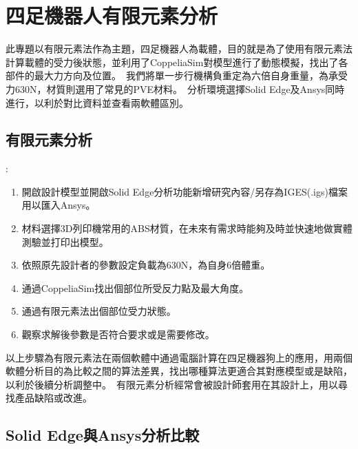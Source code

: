 \chapter{四足機器人有限元素分析}

此專題以有限元素法作為主題，四足機器人為載體，目的就是為了使用有限元素法計算載體的受力後狀態，並利用了CoppeliaSim對模型進行了動態模擬，找出了各部件的最大力方向及位置。\
我們將單一步行機構負重定為六倍自身重量，為承受力630N，材質則選用了常見的PVE材料。\
分析環境選擇Solid Edge及Ansys同時進行，以利於對比資料並查看兩軟體區別。\\

\section{有限元素分析}
\begin{itemize}
:\
  \begin{enumerate}
  \item 開啟設計模型並開啟Solid Edge分析功能新增研究內容/另存為IGES(.igs)檔案用以匯入Ansys。
  \item 材料選擇3D列印機常用的ABS材質，在未來有需求時能夠及時並快速地做實體測驗並打印出模型。
  \item 依照原先設計者的參數設定負載為630N，為自身6倍體重。
  \item 通過CoppeliaSim找出個部位所受反力點及最大角度。
  \item 通過有限元素法出個部位受力狀態。
  \item 觀察求解後參數是否符合要求或是需要修改。
  \end {enumerate}
\end{itemize}
以上步驟為有限元素法在兩個軟體中通過電腦計算在四足機器狗上的應用，用兩個軟體分析目的為比較之間的算法差異，找出哪種算法更適合其對應模型或是缺陷，以利於後續分析調整中。\
有限元素分析經常會被設計師套用在其設計上，用以尋找產品缺陷或改進。\
\newpage
\section{Solid Edge與Ansys分析比較}

\newpage
